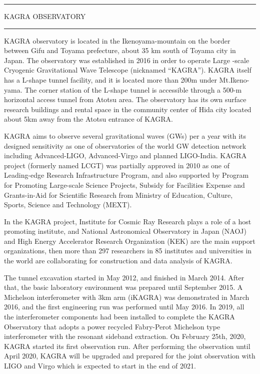 \onecolumn %

\begin{center}
\hrule
\vspace{10pt}
{\bigsf KAGRA OBSERVATORY}
\label{kagra}
\vspace{10pt}
\hrule
\end{center}

\begin{multicols}{2}
KAGRA observatory is located in the Ikenoyama-mountain on the border
between Gifu and Toyama prefecture, about 35 km south of Toyama city in
Japan. The observatory was established in 2016 in order to operate Large
-scale Cryogenic Gravitational Wave Telescope (nicknamed “KAGRA”). KAGRA
itself has a L-shape tunnel facility, and it is located more than 200m
under Mt.Ikeno-yama. The corner station of the L-shape tunnel is
accessible through a 500-m horizontal access tunnel from Atotsu area.
The observatory has its own surface research buildings and rental space
in the community center of Hida city located about 5km away from the
Atotsu entrance of KAGRA.

KAGRA aims to observe several gravitational waves (GWs) per a year with
its designed sensitivity as one of observatories of the world GW
detection network including Advanced-LIGO, Advanced-Virgo and planned
LIGO-India. KAGRA project (formerly named LCGT) was partially approved
in 2010 as one of Leading-edge Research Infrastructure Program, and also
supported by Program for Promoting Large-scale Science Projects, Subsidy
for Facilities Expense and Grants-in-Aid for Scientific Research from
Ministry of Education, Culture, Sports, Science and Technology (MEXT).

In the KAGRA project, Institute for Cosmic Ray Research plays a role of a
host promoting institute, and National Astronomical Observatory in Japan
(NAOJ) and High Energy Accelerator Research Organization (KEK) are the
main support organizations, then more than 297 researchers in 85
institutes and universities in the world are collaborating for
construction and data analysis of KAGRA.

The tunnel excavation started in May 2012, and finished in March 2014.
After that, the basic laboratory environment was prepared until
September 2015. A Michelson interferometer with 3km arm (iKAGRA) was
demonstrated in March 2016, and the first engineering run was performed
until May 2016.  In 2019, all the interferometer components had been installed to complete 
the KAGRA Observatory that adopts a power recycled Fabry-Perot Michelson type interferometer 
with the resonant sideband extraction.
On February 25th, 2020, KAGRA started its first observation run. 
After performing the observation until April 2020, KAGRA will be upgraded and prepared
for the joint observation with LIGO and Virgo which is expected to start in the end of 2021.
\end{multicols} 

